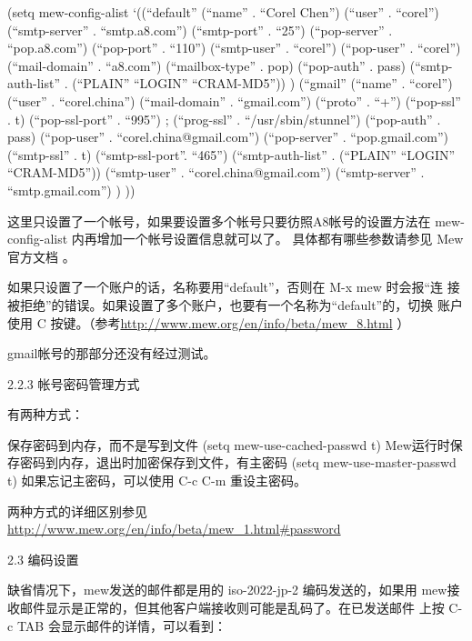 \documentclass[11pt]{article}
\begin{document}
\begin{itemize}
(setq mew-config-alist
      `((``default''
     (``name''         .  ``Corel Chen'')
     (``user''         .  ``corel'')
     (``smtp-server''  .  ``smtp.a8.com'')
     (``smtp-port''    .  ``25'')
     (``pop-server''   .  ``pop.a8.com'')
     (``pop-port''     .  ``110'')
     (``smtp-user''    .  ``corel'')
     (``pop-user''     .  ``corel'')
     (``mail-domain''  .  ``a8.com'')
     (``mailbox-type'' .  pop)
     (``pop-auth''     .  pass)
     (``smtp-auth-list'' . (``PLAIN'' ``LOGIN'' ``CRAM-MD5''))
     )
     (``gmail''
        (``name''         . ``corel'')
        (``user''         . ``corel.china'')
        (``mail-domain''  . ``gmail.com'')
        (``proto''        . ``+'')
        (``pop-ssl''      . t)
        (``pop-ssl-port'' . ``995'')
;       (``prog-ssl''     . ``/usr/sbin/stunnel'')
        (``pop-auth''     . pass)
        (``pop-user''     . ``corel.china@gmail.com'')
        (``pop-server''   . ``pop.gmail.com'')
        (``smtp-ssl''     . t)
        (``smtp-ssl-port''. ``465'')
        (``smtp-auth-list'' . (``PLAIN'' ``LOGIN'' ``CRAM-MD5''))
        (``smtp-user''    . ``corel.china@gmail.com'')
        (``smtp-server''  . ``smtp.gmail.com'')
        )
))

这里只设置了一个帐号，如果要设置多个帐号只要彷照A8帐号的设置方法在 mew-config-alist 内再增加一个帐号设置信息就可以了。 具体都有哪些参数请参见 Mew官方文档 。

如果只设置了一个账户的话，名称要用“default”，否则在 M-x mew 时会报“连 接被拒绝”的错误。如果设置了多个账户，也要有一个名称为“default”的，切换 账户使用 C 按键。（参考\href{http://www.mew.org/en/info/beta/mew_8.html}{http://www.mew.org/en/info/beta/mew\_8.html} ）

gmail帐号的那部分还没有经过测试。

2.2.3 帐号密码管理方式

有两种方式：

保存密码到内存，而不是写到文件
(setq mew-use-cached-passwd t)
Mew运行时保存密码到内存，退出时加密保存到文件，有主密码
(setq mew-use-master-passwd t)
如果忘记主密码，可以使用 C-c C-m 重设主密码。

两种方式的详细区别参见 \href{http://www.mew.org/en/info/beta/mew_1.html#password}{http://www.mew.org/en/info/beta/mew\_1.html\#password}

2.3 编码设置

缺省情况下，mew发送的邮件都是用的 iso-2022-jp-2 编码发送的，如果用 mew接收邮件显示是正常的，但其他客户端接收则可能是乱码了。在已发送邮件 上按 C-c TAB 会显示邮件的详情，可以看到：


\end{itemize}
\end{document}
